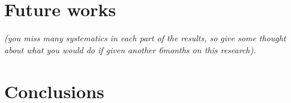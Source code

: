 \documentclass[a4paper,12pt]{article}
\begin{document}
	\section{Future works}
	\label{sec:future}
		\emph{(you miss many systematics in each part of the results, so give some thought about what you would do if given another 6months on this research).}
	\section{Conclusions}
	\label{sec:conc}

	\clearpage
	
	
\end{document}
